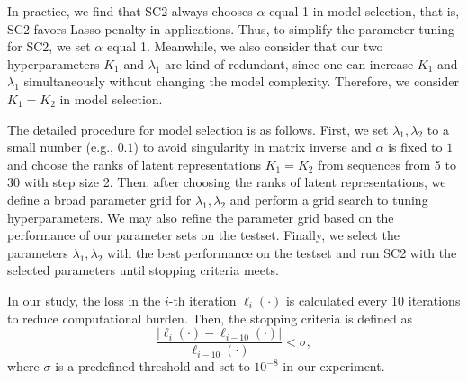 \documentclass[12pt]{article}
\begin{document}
    In practice, we find that SC2 always chooses $\alpha$ equal 1 in model selection, that is, SC2 favors Lasso penalty in applications. Thus, to simplify the parameter tuning for SC2, we set $\alpha$ equal 1. Meanwhile, we also consider that our two hyperparameters $K_1$ and $\lambda_1$ are kind of redundant, since one can increase $K_1$ and $\lambda_1$ simultaneously without changing the model complexity. Therefore, we consider $K_1 = K_2$ in model selection.

    The detailed procedure for model selection is as follows. First, we set $\lambda_1, \lambda_2$ to a small number (e.g., $0.1$) to avoid singularity in matrix inverse and $\alpha$ is fixed to $1$ and choose the ranks of latent representations $K_1 = K_2$ from sequences from 5 to 30 with step size 2. Then, after choosing the ranks of latent representations, we define a broad parameter grid for $\lambda_1, \lambda_2$ and perform a grid search to tuning hyperparameters. We may also refine the parameter grid based on the performance of our parameter sets on the testset. Finally, we select the parameters $\lambda_1, \lambda_2$ with the best performance on the testset and run SC2 with the selected parameters until stopping criteria meets.

    In our study, the loss in the $i$-th iteration $\ell_i (\cdot)$ is calculated every 10 iterations to reduce computational burden. Then, the stopping criteria is defined as
    \begin{equation}
      \frac{|\ell_i (\cdot) - \ell_{i-10} (\cdot)|}{\ell_{i-10} (\cdot)} < \sigma,
    \end{equation}
    where $\sigma$ is a predefined threshold and set to $10^{-8}$ in our experiment.

\newpage
\printbibliography
\end{document}
